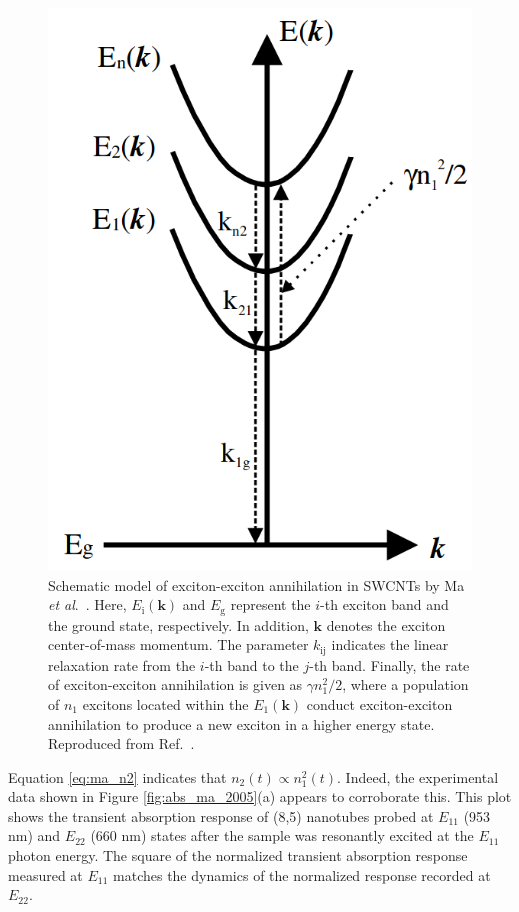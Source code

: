 \begin{figure}[H]
	\centering
	\includegraphics[scale=0.3]{images/chapter_prior_works/exciton_schematic_ma_2005}
	\caption{Schematic model of exciton-exciton annihilation in SWCNTs by Ma \textit{et al}.\ \cite{ma2005femtosecond}. Here, $E_\text{i}(\mathbf{k})$ and $E_\text{g}$ represent the $i$-th exciton band and the ground state, respectively. In addition, $\mathbf{k}$ denotes the exciton center-of-mass momentum. The parameter $k_\text{ij}$ indicates the linear relaxation rate from the $i$-th band to the $j$-th band. Finally, the rate of exciton-exciton annihilation is given as $\gamma n_1^2/2$, where a population of  $n_1$ excitons located within the $E_1(\mathbf{k})$ conduct exciton-exciton annihilation to produce a new exciton in a higher energy state. Reproduced from Ref.\ \cite{ma2005femtosecond}.}
	\label{fig:exciton_schematic_ma}
\end{figure}


Equation \eqref{eq:ma_n2} indicates that $n_2(t) \propto n_1^2(t)$. Indeed, the experimental data shown in Figure \ref{fig:abs_ma_2005}(a) appears to corroborate this. This plot shows the transient absorption response of (8,5) nanotubes probed at $E_{11}$ (953 nm) and $E_{22}$ (660 nm) states after the sample was resonantly excited at the $E_{11}$ photon energy. The square of the normalized transient absorption response measured at $E_{11}$ matches the dynamics of the normalized response recorded at $E_{22}$.

